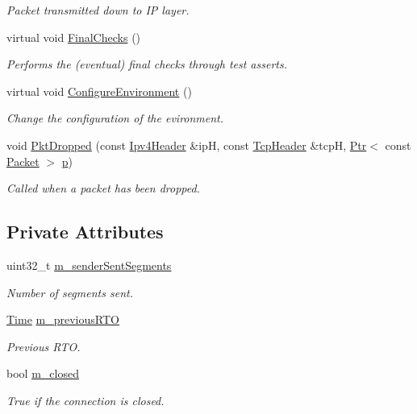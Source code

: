 \begin{DoxyCompactItemize}
\begin{DoxyCompactList}\small\item\em Packet transmitted down to IP layer. \end{DoxyCompactList}\item 
virtual void \hyperlink{classTcpTimeRtoTest_a4ffa81fada70ab736194ec6df9f8865b}{Final\+Checks} ()
\begin{DoxyCompactList}\small\item\em Performs the (eventual) final checks through test asserts. \end{DoxyCompactList}\item 
virtual void \hyperlink{classTcpTimeRtoTest_abb6359ae69a3852ca98c3683e359de82}{Configure\+Environment} ()
\begin{DoxyCompactList}\small\item\em Change the configuration of the evironment. \end{DoxyCompactList}\item 
void \hyperlink{classTcpTimeRtoTest_a38be3854a77fe9188a792cd1172ba88c}{Pkt\+Dropped} (const \hyperlink{classns3_1_1Ipv4Header}{Ipv4\+Header} \&ipH, const \hyperlink{classns3_1_1TcpHeader}{Tcp\+Header} \&tcpH, \hyperlink{classns3_1_1Ptr}{Ptr}$<$ const \hyperlink{classns3_1_1Packet}{Packet} $>$ \hyperlink{lte__link__budget__x2__handover__measures_8m_ac9de518908a968428863f829398a4e62}{p})
\begin{DoxyCompactList}\small\item\em Called when a packet has been dropped. \end{DoxyCompactList}\end{DoxyCompactItemize}
\subsection*{Private Attributes}
\begin{DoxyCompactItemize}
\item 
uint32\+\_\+t \hyperlink{classTcpTimeRtoTest_a186a4f5d05d6419be25d9de538848fab}{m\+\_\+sender\+Sent\+Segments}
\begin{DoxyCompactList}\small\item\em Number of segments sent. \end{DoxyCompactList}\item 
\hyperlink{classns3_1_1Time}{Time} \hyperlink{classTcpTimeRtoTest_a783e8a412243d5c091ace7b2e252789b}{m\+\_\+previous\+R\+TO}
\begin{DoxyCompactList}\small\item\em Previous R\+TO. \end{DoxyCompactList}\item 
bool \hyperlink{classTcpTimeRtoTest_a9328545b0ec2c15fa47feb028120baea}{m\+\_\+closed}
\begin{DoxyCompactList}\small\item\em True if the connection is closed. \end{DoxyCompactList}\end{DoxyCompactItemize}
